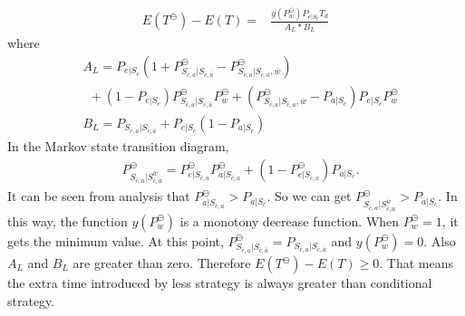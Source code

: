 \begin{equation}
\label{equ:detail1}
\begin{split}
E(T^{\ominus}) - E(T) = &\frac{y(P_{w}^{\ominus})P_{e|S_{c}}T_{d}}{A_{L}*B_{L}}
\end{split}\end{equation}
where
\begin{equation*}
\begin{split}
&A_{L}=P_{e|S_{c}}(1+P_{S_{\bar{c}, a}|S_{\bar{c},\bar{a}}}^{\ominus}-P_{S_{\bar{c}, a}|S_{\bar{c},a},\bar{w}}^{\ominus})\\
&\ \ +(1-P_{e|S_{c}})P_{S_{\bar{c}, a}|S_{\bar{c},\bar{a}}}^{\ominus}P_{w}^{\ominus}+(P_{S_{\bar{c}, a}|S_{\bar{c},a},\bar{w}}^{\ominus}-P_{a|S_{c}})P_{e|S_{c}}P_{w}^{\ominus} \\
&B_{L}=P_{S_{\bar{c}, a}|S_{\bar{c},\bar{a}}}+P_{e|S_{c}}(1-P_{a|S_{c}})
\end{split}\end{equation*}
In the Markov state transition diagram,
\begin{equation*}
\begin{split}
&P_{S_{\bar{c}, a}|S_{\bar{c},a}^{\bar{w}}}^{\ominus}=P_{e|S_{\bar{c}, a}}^{\ominus}P_{a|S_{\bar{c}, a}}^{\ominus}+(1-P_{e|S_{\bar{c}, a}}^{\ominus})P_{a|S_{c}} .
\end{split}\end{equation*}
It can be seen from analysis that $P_{a|S_{\bar{c}, a}}^{\ominus} > P_{a|S_{c}}$.
So we can get $P_{S_{\bar{c}, a}|S_{\bar{c},a}^{\bar{w}}}^{\ominus} > P_{a|S_{c}}$.
In this way,
the function $y(P_{w}^{\ominus})$ is a monotony decrease function. When $P_{w}^{\ominus} = 1$, it gets the minimum value.
At this point, $P_{S_{\bar{c}, a}|S_{\bar{c},\bar{a}}}^{\ominus} = P_{S_{\bar{c}, a}|S_{\bar{c},\bar{a}}}$ and $y(P_{w}^{\ominus}) = 0$.
Also $A_{L}$ and $B_{L}$ are greater than zero.
Therefore $E(T^{\ominus}) - E(T)\geq 0$.
That means the extra time introduced by less {\vwarm} strategy is always greater than conditional {\vwarm} strategy.

